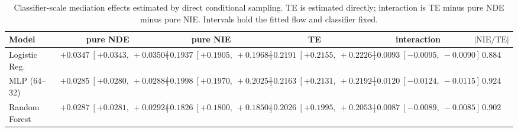 \begin{table}[htbp]
  \centering
  \caption{Classifier-scale mediation effects estimated by direct conditional sampling. TE is estimated directly; interaction is TE minus pure NDE minus pure NIE. Intervals hold the fitted flow and classifier fixed.}
  \label{tab:german_synth_gap_overall}
  \begin{tabular}{lccccc}
    \toprule
    Model & pure NDE & pure NIE & TE & interaction & $|\mathrm{NIE}/\mathrm{TE}|$ \\
    \midrule
    Logistic Reg. & $+0.0347\ [+0.0343,\ +0.0350]$ & $+0.1937\ [+0.1905,\ +0.1968]$ & $+0.2191\ [+0.2155,\ +0.2226]$ & $-0.0093\ [-0.0095,\ -0.0090]$ & 0.884 \\
    MLP (64--32) & $+0.0285\ [+0.0280,\ +0.0288]$ & $+0.1998\ [+0.1970,\ +0.2025]$ & $+0.2163\ [+0.2131,\ +0.2192]$ & $-0.0120\ [-0.0124,\ -0.0115]$ & 0.924 \\
    Random Forest & $+0.0287\ [+0.0281,\ +0.0292]$ & $+0.1826\ [+0.1800,\ +0.1850]$ & $+0.2026\ [+0.1995,\ +0.2053]$ & $-0.0087\ [-0.0089,\ -0.0085]$ & 0.902 \\
    \bottomrule
  \end{tabular}
\end{table}